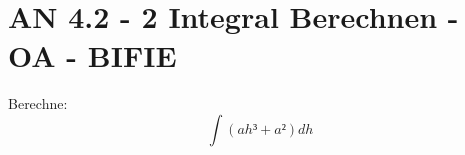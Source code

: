 \section{AN 4.2 - 2 Integral Berechnen - OA - BIFIE}

\begin{beispiel}[AN 4.2]{1} %
				Berechne: $$\int{(ah³+a²)dh}$$
				\leer
				
\end{beispiel}